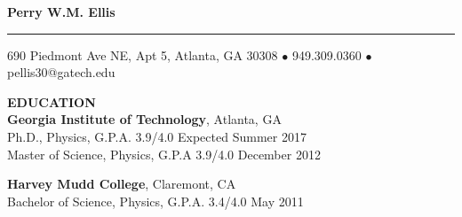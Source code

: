 \documentclass[10pt]{article}
\newcommand{\HRule}{\rule{\linewidth}{0.5mm}}
\newenvironment{changemargin}[2]{%
  \list{}{\rightmargin#2\leftmargin#1
    \parsep=0pt\topsep=1pt\partopsep=0pt}
\item[]} {\endlist}
\newenvironment{indentmore}{\begin{changemargin}{10pt}{0cm}}{\end{changemargin}}
\begin{document}
\begin{center}

\textbf{\Large Perry W.M. Ellis}
\HRule

690 Piedmont Ave NE, Apt 5, Atlanta, GA 30308 $\bullet$ 949.309.0360 $\bullet$ pellis30@gatech.edu

\end{center}


\vspace{10pt}
\textbf{\large EDUCATION} \\
\textbf{Georgia Institute of Technology}, Atlanta, GA\\
\hspace*{10pt}Ph.D., Physics, G.P.A. 3.9/4.0 \hfill Expected Summer 2017\\
\hspace*{10pt}Master of Science, Physics, G.P.A 3.9/4.0 \hfill December 2012

\vspace{10pt}

\textbf{Harvey Mudd College}, Claremont, CA \\
\hspace*{10pt}Bachelor of Science, Physics, G.P.A. 3.4/4.0 \hfill May 2011
\end{document}
